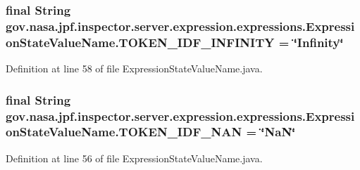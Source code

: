 \subsubsection[{\texorpdfstring{T\+O\+K\+E\+N\+\_\+\+I\+D\+F\+\_\+\+I\+N\+F\+I\+N\+I\+TY}{TOKEN_IDF_INFINITY}}]{\setlength{\rightskip}{0pt plus 5cm}final String gov.\+nasa.\+jpf.\+inspector.\+server.\+expression.\+expressions.\+Expression\+State\+Value\+Name.\+T\+O\+K\+E\+N\+\_\+\+I\+D\+F\+\_\+\+I\+N\+F\+I\+N\+I\+TY = \char`\"{}Infinity\char`\"{}\hspace{0.3cm}{\ttfamily [static]}}\hypertarget{classgov_1_1nasa_1_1jpf_1_1inspector_1_1server_1_1expression_1_1expressions_1_1_expression_state_value_name_a52184205cd89e72676584c0f3ef6aa9c}{}\label{classgov_1_1nasa_1_1jpf_1_1inspector_1_1server_1_1expression_1_1expressions_1_1_expression_state_value_name_a52184205cd89e72676584c0f3ef6aa9c}


Definition at line 58 of file Expression\+State\+Value\+Name.\+java.

\subsubsection[{\texorpdfstring{T\+O\+K\+E\+N\+\_\+\+I\+D\+F\+\_\+\+N\+AN}{TOKEN_IDF_NAN}}]{\setlength{\rightskip}{0pt plus 5cm}final String gov.\+nasa.\+jpf.\+inspector.\+server.\+expression.\+expressions.\+Expression\+State\+Value\+Name.\+T\+O\+K\+E\+N\+\_\+\+I\+D\+F\+\_\+\+N\+AN = \char`\"{}NaN\char`\"{}\hspace{0.3cm}{\ttfamily [static]}}\hypertarget{classgov_1_1nasa_1_1jpf_1_1inspector_1_1server_1_1expression_1_1expressions_1_1_expression_state_value_name_a60b9cad6eaa4f82de36390a081c8564f}{}\label{classgov_1_1nasa_1_1jpf_1_1inspector_1_1server_1_1expression_1_1expressions_1_1_expression_state_value_name_a60b9cad6eaa4f82de36390a081c8564f}


Definition at line 56 of file Expression\+State\+Value\+Name.\+java.

